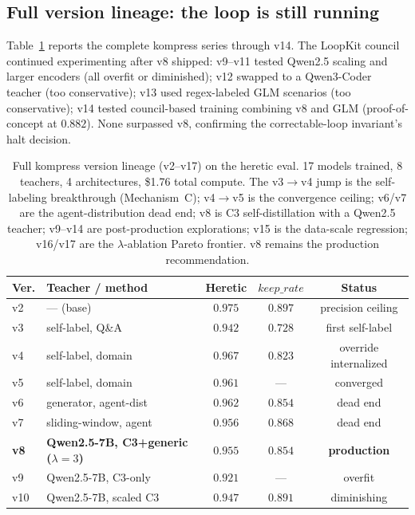 \subsection{Full version lineage: the loop is still running}
\label{sec:eval:lineage}

Table~\ref{tab:lineage} reports the complete kompress series through v14.
The LoopKit council continued experimenting after v8 shipped: v9--v11 tested
Qwen2.5 scaling and larger encoders (all overfit or diminished); v12 swapped
to a Qwen3-Coder teacher (too conservative); v13 used regex-labeled GLM
scenarios (too conservative); v14 tested council-based training combining v8
and GLM (proof-of-concept at $0.882$). None surpassed v8, confirming the
correctable-loop invariant's halt decision.

\begin{table}[h]
\centering
\caption{Full kompress version lineage (v2--v17) on the heretic eval. 17
models trained, 8 teachers, 4 architectures, \$1.76 total compute. The
v3$\to$v4 jump is the self-labeling breakthrough (Mechanism~C); v4$\to$v5
is the convergence ceiling; v6/v7 are the agent-distribution dead end; v8
is C3 self-distillation with a Qwen2.5 teacher; v9--v14 are
post-production explorations; v15 is the data-scale regression; v16/v17
are the $\lambda$-ablation Pareto frontier. v8 remains the production
recommendation.}
\label{tab:lineage}
\begin{tabular}{llccc}
\toprule
Ver. & Teacher / method & Heretic & $\mathit{keep\_rate}$ & Status \\
\midrule
v2  & --- (base)                   & $0.975$ & $0.897$ & precision ceiling \\
v3  & self-label, Q\&A             & $0.942$ & $0.728$ & first self-label \\
v4  & self-label, domain           & $0.967$ & $0.823$ & override internalized \\
v5  & self-label, domain           & $0.961$ & ---     & converged \\
v6  & generator, agent-dist        & $0.962$ & $0.854$ & dead end \\
v7  & sliding-window, agent        & $0.956$ & $0.868$ & dead end \\
\textbf{v8}  & \textbf{Qwen2.5-7B, C3+generic ($\lambda{=}3$)} & $\mathbf{0.955}$ & $0.854$ & \textbf{production} \\
v9  & Qwen2.5-7B, C3-only          & $0.921$ & ---     & overfit \\
v10 & Qwen2.5-7B, scaled C3        & $0.947$ & $0.891$ & diminishing \\

\end{tabular}
\end{table}
